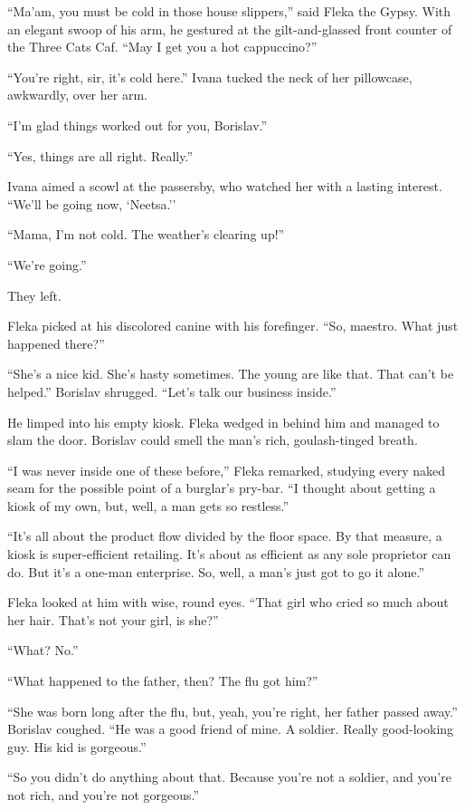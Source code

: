 \documentclass[20 pt,twoside,extrafontsizes,final]{memoir}
\begin{document}
``Ma'am, you must be cold in those house slippers,'' said Fleka the Gypsy. With an elegant swoop of his arm, he gestured at the gilt-and-glassed front counter of the Three Cats Caf. ``May I get you a hot cappuccino?''

``You're right, sir, it's cold here.'' Ivana tucked the neck of her pillowcase, awkwardly, over her arm.

``I'm glad things worked out for you, Borislav.''

``Yes, things are all right. Really.''

Ivana aimed a scowl at the passersby, who watched her with a lasting interest. ``We'll be going now, `Neetsa.''

``Mama, I'm not cold. The weather's clearing up!''

``We're going.'' 

They left.

Fleka picked at his discolored canine with his forefinger. ``So, maestro. What just happened there?''

``She's a nice kid. She's hasty sometimes. The young are like that. That can't be helped.'' Borislav shrugged. ``Let's talk our business inside.''

He limped into his empty kiosk. Fleka wedged in behind him and managed to slam the door. Borislav could smell the man's rich, goulash-tinged breath.

``I was never inside one of these before,'' Fleka remarked, studying every naked seam for the possible point of a burglar's pry-bar. ``I thought about getting a kiosk of my own, but, well, a man gets so restless.'' 

``It's all about the product flow divided by the floor space. By that measure, a kiosk is super-efficient retailing. It's about as efficient as any sole proprietor can do. But it's a one-man enterprise. So, well, a man's just got to go it alone.''

Fleka looked at him with wise, round eyes. ``That girl who cried so much about her hair. That's not your girl, is she?''

``What? No.''

``What happened to the father, then? The flu got him?''

``She was born long after the flu, but, yeah, you're right, her father passed away.'' Borislav coughed. ``He was a good friend of mine. A soldier. Really good-looking guy. His kid is gorgeous.''

``So you didn't do anything about that. Because you're not a soldier, and you're not rich, and you're not gorgeous.''
\end{document}
